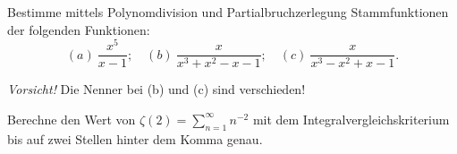 \vspace{0.3cm}

\begin{prob}
Bestimme mittels Polynomdivision und Partialbruchzerlegung Stammfunktionen der folgenden Funktionen:
$$
(a)\ \frac{x^5}{x-1};\quad
(b)\ \frac{x}{x^3+x^2-x-1};\quad
(c)\ \frac{x}{x^3-x^2+x-1}.
$$

\textit{Vorsicht!} Die Nenner bei (b) und (c) sind verschieden!
\end{prob}

\vspace{0.3cm}

\begin{prob}
Berechne den Wert von $\zeta(2)=\sum_{n=1}^\infty n^{-2}$ mit dem
Integralvergleichskriterium bis auf zwei Stellen hinter dem Komma genau.
\end{prob}
